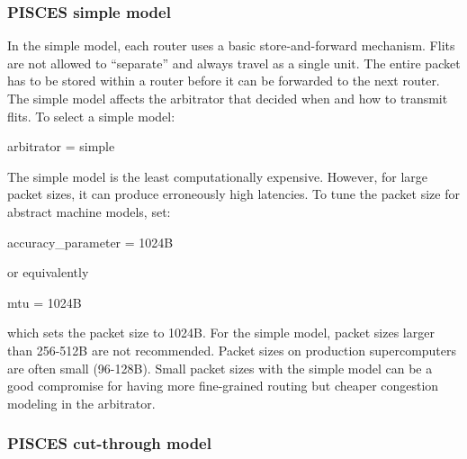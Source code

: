 \subsubsection{PISCES simple model}
\label{subsubsec:tutorial:simplePisces}
In the simple model, each router uses a basic store-and-forward mechanism.
Flits are not allowed to ``separate'' and always travel as a single unit.
The entire packet has to be stored within a router before it can be forwarded to the next router.
The simple model affects the arbitrator that decided when and how to transmit flits.
To select a simple model:

\begin{ViFile}
arbitrator = simple
\end{ViFile}
The simple model is the least computationally expensive. 
However, for large packet sizes, it can produce erroneously high latencies.
To tune the packet size for abstract machine models, set:

\begin{ViFile}
accuracy_parameter = 1024B
\end{ViFile}
or equivalently 
\begin{ViFile}
mtu = 1024B
\end{ViFile}
which sets the packet size to 1024B. 
For the simple model, packet sizes larger than 256-512B are not recommended.
Packet sizes on production supercomputers are often small (96-128B).
Small packet sizes with the simple model can be a good compromise for having more fine-grained routing but cheaper congestion modeling in the arbitrator.

\subsubsection{PISCES cut-through model}
\label{subsubsec:tutorial:cutThroughPisces}

